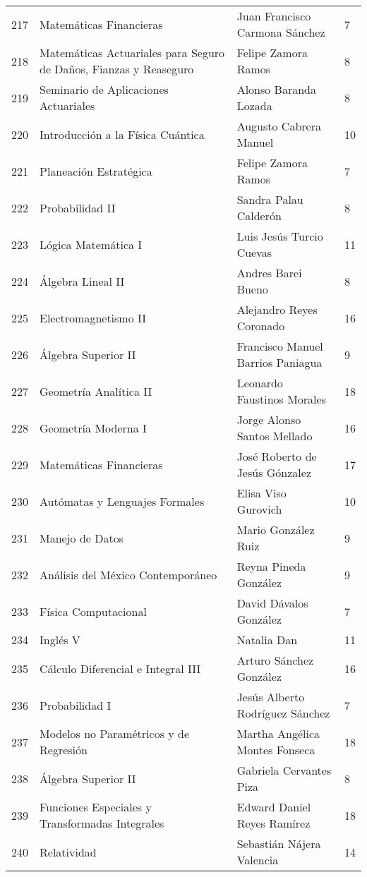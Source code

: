 \begin{table}[ht]
\begin{tabular}{rlll}
  217 & Matemáticas Financieras & Juan Francisco Carmona Sánchez & 7 \\ 
  218 & Matemáticas Actuariales para Seguro de Daños, Fianzas y Reaseguro & Felipe Zamora Ramos & 8 \\ 
  219 & Seminario de Aplicaciones Actuariales & Alonso Baranda Lozada & 8 \\ 
  220 & Introducción a la Física Cuántica & Augusto Cabrera Manuel & 10 \\ 
  221 & Planeación Estratégica & Felipe Zamora Ramos & 7 \\ 
  222 & Probabilidad II & Sandra Palau Calderón & 8 \\ 
  223 & Lógica Matemática I & Luis Jesús Turcio Cuevas & 11 \\ 
  224 & Álgebra Lineal II & Andres Barei Bueno & 8 \\ 
  225 & Electromagnetismo II & Alejandro Reyes Coronado & 16 \\ 
  226 & Álgebra Superior II & Francisco Manuel Barrios Paniagua & 9 \\ 
  227 & Geometría Analítica II & Leonardo Faustinos Morales & 18 \\ 
  228 & Geometría Moderna I & Jorge Alonso Santos Mellado & 16 \\ 
  229 & Matemáticas Financieras & José Roberto de Jesús Gónzalez & 17 \\ 
  230 & Autómatas y Lenguajes Formales & Elisa Viso Gurovich & 10 \\ 
  231 & Manejo de Datos & Mario González Ruiz & 9 \\ 
  232 & Análisis del México Contemporáneo & Reyna Pineda González & 9 \\ 
  233 & Física Computacional & David Dávalos González & 7 \\ 
  234 & Inglés V & Natalia Dan & 11 \\ 
  235 & Cálculo Diferencial e Integral III & Arturo Sánchez González & 16 \\ 
  236 & Probabilidad I & Jesús Alberto Rodríguez Sánchez & 7 \\ 
  237 & Modelos no Paramétricos y de Regresión & Martha Angélica Montes Fonseca & 18 \\ 
  238 & Álgebra Superior II & Gabriela Cervantes Piza & 8 \\ 
  239 & Funciones Especiales y Transformadas Integrales & Edward Daniel Reyes Ramírez & 18 \\ 
  240 & Relatividad & Sebastián Nájera Valencia & 14 \\ 

\end{tabular}
\end{table}
